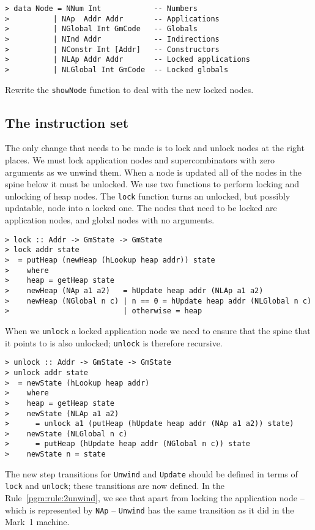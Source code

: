 \begin{verbatim}
> data Node = NNum Int            -- Numbers
>          | NAp  Addr Addr       -- Applications
>          | NGlobal Int GmCode   -- Globals
>          | NInd Addr            -- Indirections
>          | NConstr Int [Addr]   -- Constructors
>          | NLAp Addr Addr       -- Locked applications
>          | NLGlobal Int GmCode  -- Locked globals
\end{verbatim}
%
%
%
%
%
%
%
\begin{exercise}\label{pgm:X:2nodeprint}
Rewrite the \mbox{\tt showNode} function to deal with the new locked nodes.
\end{exercise}

\subsection{The instruction set}

The only change that needs to be made is to lock and unlock nodes at
the right places. We must lock application nodes and supercombinators
with zero arguments as we unwind them. When a node is updated all of
the nodes in the spine below it must be unlocked.
We use two functions to perform locking and unlocking of heap nodes.
The \mbox{\tt lock} function turns an unlocked, but possibly updatable, node
into a locked one. The nodes that need to be locked are application
nodes, and global nodes with no arguments.
\begin{verbatim}
> lock :: Addr -> GmState -> GmState
> lock addr state
>  = putHeap (newHeap (hLookup heap addr)) state
>    where
>    heap = getHeap state
>    newHeap (NAp a1 a2)   = hUpdate heap addr (NLAp a1 a2)
>    newHeap (NGlobal n c) | n == 0 = hUpdate heap addr (NLGlobal n c)
>                          | otherwise = heap
\end{verbatim}
%
%
\par
When we \mbox{\tt unlock} a locked application node we need to ensure that the
spine that it points to is also unlocked; \mbox{\tt unlock} is therefore recursive.
\begin{verbatim}
> unlock :: Addr -> GmState -> GmState
> unlock addr state
>  = newState (hLookup heap addr)
>    where
>    heap = getHeap state
>    newState (NLAp a1 a2)
>      = unlock a1 (putHeap (hUpdate heap addr (NAp a1 a2)) state)
>    newState (NLGlobal n c)
>      = putHeap (hUpdate heap addr (NGlobal n c)) state
>    newState n = state
\end{verbatim}
%
%
\par
The new step transitions for \mbox{\tt Unwind} and \mbox{\tt Update} should be defined
in terms of \mbox{\tt lock} and \mbox{\tt unlock}; these transitions are now defined. In
the Rule~\ref{pgm:rule:2unwind}, we see that apart from locking the
application node -- which is represented by \mbox{\tt *NAp} -- \mbox{\tt Unwind} has the
same transition as it did in the Mark~1 machine.

